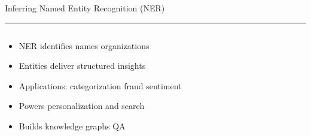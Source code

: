 \documentclass[aspectratio=169]{beamer}
\newcommand{\TitleFont}{\rmfamily}
\begin{document}
\begin{frame}[t]{}
  \vspace*{0.5cm}
  {\TitleFont\fontsize{18}{22}\selectfont\color{LUBronze}Inferring Named Entity Recognition (NER)\par}
  \vspace{0.3em}
  {\color{LUBronze}\rule{\linewidth}{0.8pt}}\par
  \vspace{0.2cm}
  \begin{columns}[t]
    \begin{column}[t]{0.45\textwidth}
      \vspace*{0pt}
      \begin{itemize}\setlength\itemsep{0.65em}
        \item NER identifies names organizations
        \item Entities deliver structured insights
        \item Applications: categorization fraud sentiment
        \item Powers personalization and search
        \item Builds knowledge graphs QA
      \end{itemize}
    \end{column}
  \end{columns}
\end{frame}
\end{document}
